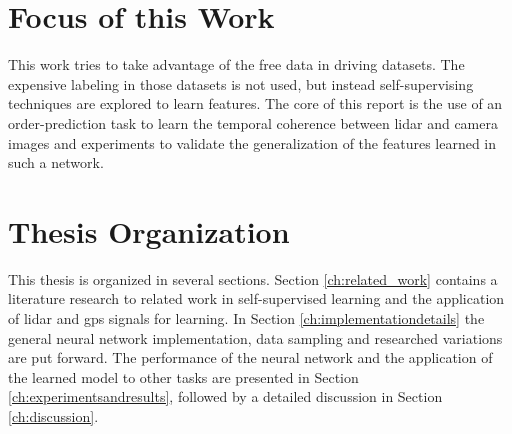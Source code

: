 \section{Focus of this Work}
This work tries to take advantage of the free data in driving datasets. The expensive labeling in those datasets is not used, but instead self-supervising techniques are explored to learn features. The core of this report is the use of an order-prediction task to learn the temporal coherence between lidar and camera images and experiments to validate the generalization of the features learned in such a network.

\section{Thesis Organization}
This thesis is organized in several sections. Section \ref{ch:related_work} contains a literature research to related work in self-supervised learning and the application of lidar and gps signals for learning. In Section \ref{ch:implementationdetails} the general neural network implementation, data sampling and researched variations are put forward. The performance of the neural network and the application of the learned model to other tasks are presented in Section \ref{ch:experimentsandresults}, followed by a detailed discussion in Section \ref{ch:discussion}.
